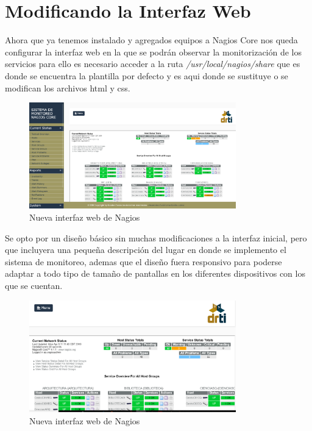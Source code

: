 \documentclass[12pt]{book}
\begin{document}
    \section{ Modificando la Interfaz Web }
    Ahora que ya tenemos instalado y agregados equipos a Nagios Core nos queda configurar la interfaz web en la que se podrán observar
    la monitorización de los servicios para ello es necesario acceder a la ruta {\itshape /usr/local/nagios/share } que es donde se 
    encuentra la plantilla por defecto y es aqui donde se sustituye o se modifican los archivos html y css.
    \begin{figure}[H]
      \centering
        \includegraphics[width=0.8\textwidth]{./Imagenes/interfaz.png}
      \caption{Nueva interfaz web de Nagios} \label{fig:Nagios-DRTI}
    \end{figure}

    Se opto por un diseño básico sin muchas modificaciones a la interfaz inicial, pero que incluyera una pequeña descripción del lugar
    en donde se implemento el sistema de monitoreo, ademas que el diseño fuera responsivo para poderse adaptar a todo tipo de tamaño de
    pantallas en los diferentes dispositivos con los que se cuentan.
    \begin{figure}[htb]
      \centering
        \includegraphics[width=0.8\textwidth]{./Imagenes/responsive.png}
      \caption{Nueva interfaz web de Nagios} \label{fig:Nagios-DRTI}
    \end{figure}
\end{document}
